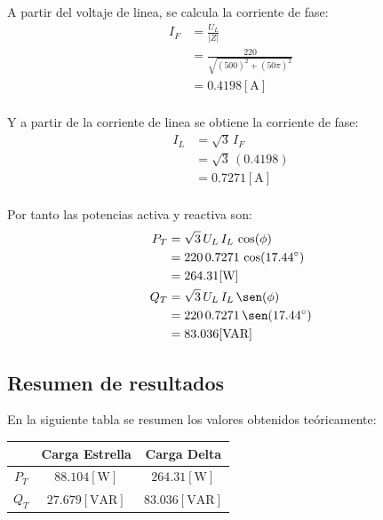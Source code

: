 \documentclass[letter,11pt]{article}
\begin{document}
A partir del voltaje de linea, se calcula la corriente de fase:
\begin{equation*}
    \begin{split}
        I_F &= \frac{U_L}{|Z|}\\
            &= \frac{220}{\sqrt{(500)^2+(50\pi)^2}}\\
            &= 0.4198[\text{A}]\\
    \end{split}
\end{equation*}

Y a partir de la corriente de linea se obtiene la corriente de fase:
\begin{equation*}
    \begin{split}
        I_L &= \sqrt{3}\,I_F\\
            &= \sqrt{3}\,(0.4198)\\
            &= 0.7271[\text{A}]\\
    \end{split}
\end{equation*}

Por tanto las potencias activa y reactiva son:
\begin{equation*}
    \begin{split}
        P_T &= \sqrt{3}\,U_L\,I_L\,\cos(\phi)\\
            &= 220\,0.7271\,\cos(17.44^{\circ})\\
            &= 264.31[\text{W}]\\
        Q_T &= \sqrt{3}\,U_L\,I_L\,\sen(\phi)\\
            &= 220\,0.7271\,\sen(17.44^{\circ})\\
            &= 83.036[\text{VAR}]\\
    \end{split}
\end{equation*}

\subsection{Resumen de resultados}
En la siguiente tabla se resumen los valores obtenidos teóricamente:

\begin{center}
    \begin{tabular}{|c||c|c|}
    \hline
    & \textbf{Carga Estrella} & \textbf{Carga Delta}
    \tabularnewline \hline \hline
    $P_T$ &
    $88.104[\text{W}]$ &
    $264.31[\text{W}]$
    \tabularnewline \hline
    $Q_T$ &
    $27.679[\text{VAR}]$ &
    $83.036[\text{VAR}]$
    \tabularnewline \hline
    \end{tabular}
\end{center}
\end{document}

